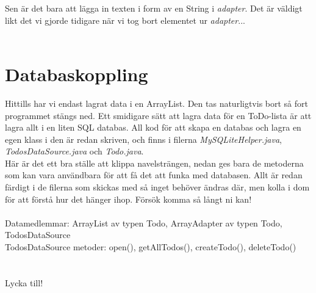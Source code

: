 \documentclass[11 pt, titlepage]{article} %
\begin{document}
Sen är det bara att lägga in texten i form av en String i \textit{adapter}. Det är väldigt likt det vi gjorde tidigare när vi tog bort elementet ur \textit{adapter}...\\ \\
\section{Databaskoppling}
Hittills har vi endast lagrat data i en ArrayList. Den tas naturligtvis bort så fort programmet stängs ned. Ett smidigare sätt att lagra data för en ToDo-lista är att lagra allt i en liten SQL databas. All kod för att skapa en databas och lagra en egen klass i den är redan skriven, och finns i filerna \textit{MySQLiteHelper.java}, \textit{TodosDataSource.java} och \textit{Todo.java}.\\

Här är det ett bra ställe att klippa navelsträngen, nedan ges bara de metoderna som kan vara användbara för att få det att funka med databasen. Allt är redan färdigt i de filerna som skickas med så inget behöver ändras där, men kolla i dom för att förstå hur det hänger ihop. Försök komma så långt ni kan!\\ \\

Datamedlemmar: ArrayList av typen Todo, ArrayAdapter av typen Todo, TodosDataSource \\
TodosDataSource metoder: open(), getAllTodos(), createTodo(), deleteTodo() \\

\\ \\

Lycka till!
\end{document}
